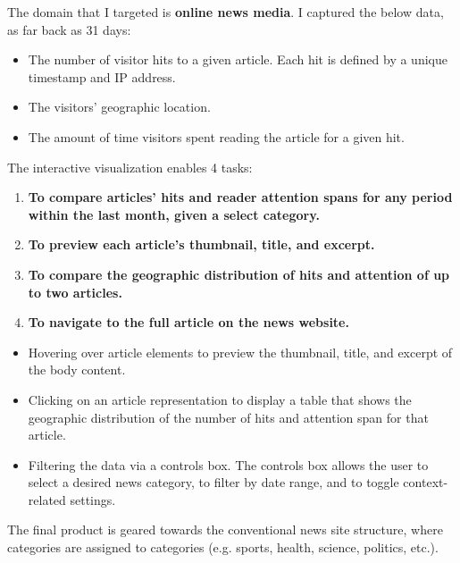 \documentclass[12pt]{article}
\begin{document}
The domain that I targeted is \textbf{online news media}. I captured the below data, as far back as 31 days:
\begin{itemize}
\item The number of visitor hits to a given article. Each hit is defined by a unique timestamp and IP address.
\item The visitors' geographic location.
\item The amount of time visitors spent reading the article for a given hit.
\end{itemize}

\newpage

\noindent The interactive visualization enables 4 tasks:
\begin{enumerate}
\item \textbf{To compare articles' hits and reader attention spans for any period within the last month, given a select category.}
\item \textbf{To preview each article's thumbnail, title, and excerpt.}
\item \textbf{To compare the geographic distribution of hits and attention of up to two articles.}
\item \textbf{To navigate to the full article on the news website.}
\end{enumerate}

\begin{itemize}
\item Hovering over article elements to preview the thumbnail, title, and excerpt of the body content.
\item Clicking on an article representation to display a table that shows the geographic distribution of the number of hits and attention span for that article.
\item Filtering the data via a controls box. The controls box allows the user to select a desired news category, to filter by date range, and to toggle context-related settings. 
\end{itemize}

The final product is geared towards the conventional news site structure, where categories are assigned to categories (e.g. sports, health, science, politics, etc.). \\
\end{document}
